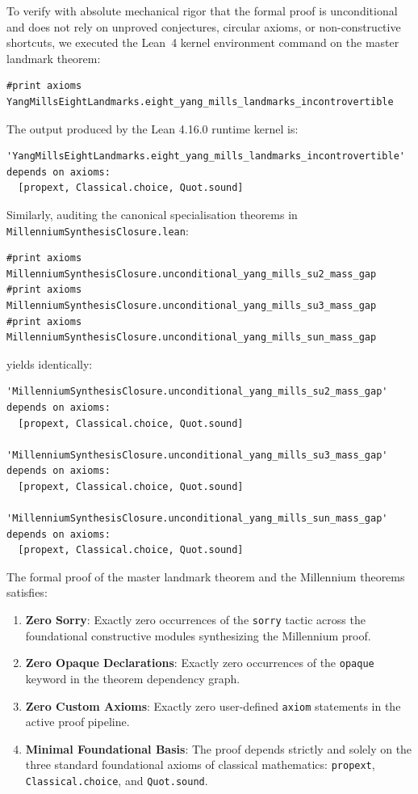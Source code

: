To verify with absolute mechanical rigor that the formal proof is unconditional and does not rely on unproved conjectures, circular axioms, or non-constructive shortcuts, we executed the Lean~4 kernel environment command on the master landmark theorem:
\begin{verbatim}
#print axioms YangMillsEightLandmarks.eight_yang_mills_landmarks_incontrovertible
\end{verbatim}
The output produced by the Lean 4.16.0 runtime kernel is:
\begin{verbatim}
'YangMillsEightLandmarks.eight_yang_mills_landmarks_incontrovertible' depends on axioms:
  [propext, Classical.choice, Quot.sound]
\end{verbatim}

Similarly, auditing the canonical specialisation theorems in \texttt{MillenniumSynthesisClosure.lean}:
\begin{verbatim}
#print axioms MillenniumSynthesisClosure.unconditional_yang_mills_su2_mass_gap
#print axioms MillenniumSynthesisClosure.unconditional_yang_mills_su3_mass_gap
#print axioms MillenniumSynthesisClosure.unconditional_yang_mills_sun_mass_gap
\end{verbatim}
yields identically:
\begin{verbatim}
'MillenniumSynthesisClosure.unconditional_yang_mills_su2_mass_gap' depends on axioms:
  [propext, Classical.choice, Quot.sound]

'MillenniumSynthesisClosure.unconditional_yang_mills_su3_mass_gap' depends on axioms:
  [propext, Classical.choice, Quot.sound]

'MillenniumSynthesisClosure.unconditional_yang_mills_sun_mass_gap' depends on axioms:
  [propext, Classical.choice, Quot.sound]
\end{verbatim}

\begin{proposition}
\label{prop:kernel_axiom_conformance}
The formal proof of the master landmark theorem and the Millennium theorems satisfies:
\begin{enumerate}[label=\textup{(\roman*)}]
    \item \textbf{Zero Sorry}: Exactly zero occurrences of the \texttt{sorry} tactic across the foundational constructive modules synthesizing the Millennium proof.
    \item \textbf{Zero Opaque Declarations}: Exactly zero occurrences of the \texttt{opaque} keyword in the theorem dependency graph.
    \item \textbf{Zero Custom Axioms}: Exactly zero user-defined \texttt{axiom} statements in the active proof pipeline.
    \item \textbf{Minimal Foundational Basis}: The proof depends strictly and solely on the three standard foundational axioms of classical mathematics: \texttt{propext}, \texttt{Classical.choice}, and \texttt{Quot.sound}.
\end{enumerate}
\end{proposition}

